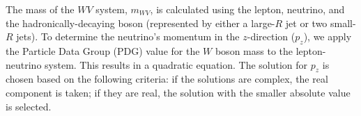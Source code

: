 The mass of the $WV$ system, $m_{WV}$, is calculated using the lepton, neutrino, and the hadronically-decaying boson (represented by either a large-$R$ jet or two small-$R$ jets). To determine the neutrino's momentum in the $z$-direction ($p_z$), we apply the Particle Data Group (PDG) value for the $W$ boson mass to the lepton-neutrino system. This results in a quadratic equation. The solution for $p_z$ is chosen based on the following criteria: if the solutions are complex, the real component is taken; if they are real, the solution with the smaller absolute value is selected.


